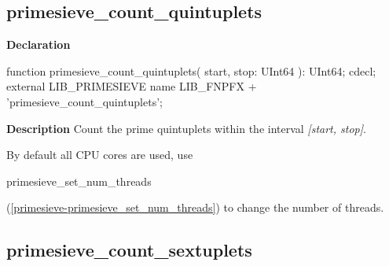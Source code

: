 \documentclass{report}
\newif\ifpdf
\begin{document}
\subsection*{primesieve{\_}count{\_}quintuplets}
\fi
\label{primesieve-primesieve_count_quintuplets}
\begin{list}{}{
\setlength{\itemindent}{0cm}
\setlength{\listparindent}{0cm}
\setlength{\leftmargin}{\evensidemargin}
\addtolength{\leftmargin}{\tmplength}
\settowidth{\labelsep}{X}
\addtolength{\leftmargin}{\labelsep}
\setlength{\labelwidth}{\tmplength}
}
\item[\textbf{Declaration}\hfill]
\ifpdf
\begin{flushleft}
\fi
\begin{ttfamily}
function primesieve{\_}count{\_}quintuplets( start, stop: UInt64 ): UInt64; cdecl; external LIB{\_}PRIMESIEVE name LIB{\_}FNPFX + 'primesieve{\_}count{\_}quintuplets';\end{ttfamily}

\ifpdf
\end{flushleft}
\fi

\par
\item[\textbf{Description}]
Count the prime quintuplets within the interval \textit{[start, stop]}.

By default all CPU cores are used, use \begin{ttfamily}primesieve{\_}set{\_}num{\_}threads\end{ttfamily}(\ref{primesieve-primesieve_set_num_threads}) to change the number of threads.

\end{list}
\ifpdf
\subsection*{\large{\textbf{primesieve{\_}count{\_}sextuplets}}\normalsize\hspace{1ex}\hrulefill}
\else
\end{document}
